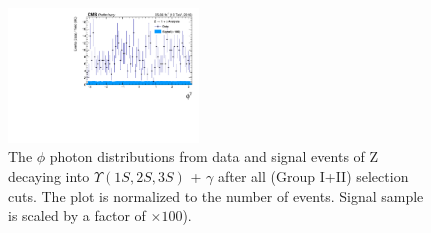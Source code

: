 \begin{figure}[!htbp]
\begin{center}
\includegraphics[width=0.45\textwidth]{figures_and_tables/outputPlots/ZtoUpsilon_Cat0_ZZZZZ/nEvts/data_x_mc/withKinCuts/h_withKin_Photon_phi}\hspace*{1.cm}
\end{center}\vspace*{-.5cm}
\caption{The $\phi$ photon distributions from data and signal events of Z decaying into $\Upsilon(1S,2S,3S)$ + $\gamma$ after all (Group I+II) selection cuts. The plot is normalized to the number of events. Signal sample is scaled by a factor of $\times 100$).}
\label{fig:phiPhoton_ZtoUpsilon_Cat0_groupI_plus_II}
\end{figure}

